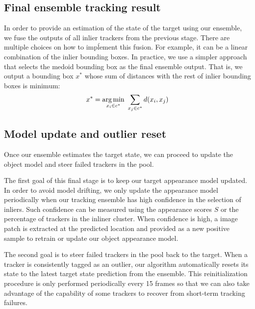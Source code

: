 \subsection{Final ensemble tracking result}
In order to provide an estimation of the state of the target using our
ensemble, we fuse the outputs of all inlier trackers from the previous stage.
There are multiple choices on how to impĺement this fusion. For example,
it can be a linear combination of the inlier bounding boxes. In practice,
we use a simpler approach that selects the medoid bounding box as the final
ensemble output. That is, we output a
bounding box $x^{*}$
whose sum of distances with the rest of inlier bounding boxes
is minimum:
\begin{equation}
x^{*} = \operatorname*{arg\,min}_{x_{i} \in c^*}  ~\sum_{x_{j} \in c^{*}}d(x_{i}, x_{j}) 
\end{equation}

\subsection{Model update and outlier reset}
Once our ensemble estimates the target state, we can proceed to update the
object model and steer failed trackers in the pool.

The first goal of this final stage is to keep our target appearance model
updated. In order to avoid model drifting, we only update the appearance
model periodically when our tracking ensemble has high confidence in the
selection of inliers. Such confidence can be measured using the appearance
scores $S$ or the percentage of trackers in the inliner cluster.
When confidence is high, a image patch is extracted at the predicted
location and provided as a new positive sample to retrain or update
our object appearance model.

The second goal is to steer failed trackers in the pool back to the target.
When a tracker is consistently tagged as an outlier, our algorithm automatically
resets its state to the latest target state prediction from the ensemble.
This reinitialization procedure is only performed periodically every 15 frames
so that we can also take advantage of the capability of some trackers
to recover from short-term tracking failures.


